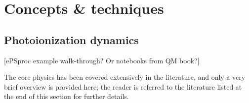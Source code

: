 \section{Concepts \& techniques}

\subsection{Photoionization dynamics} 
[ePSproc example walk-through? Or notebooks from QM book?]

The core physics has been covered extensively in the literature, and only a very brief overview is provided here; the reader is referred to the literature listed at the end of this section for further details.